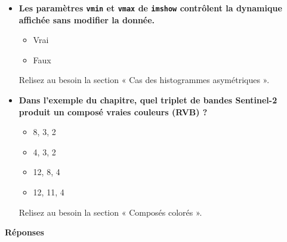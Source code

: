 \documentclass[
  french,
  11pt,
  letterpaper,
  open=any,
  twoside=false,
  french]{scrbook}
\providecommand{\tightlist}{%
  \setlength{\itemsep}{0pt}\setlength{\parskip}{0pt}}
\begin{document}
\begin{itemize}
  Relisez au besoin la section « Égalisation d'histogramme ».
\item
  \textbf{Les paramètres \texttt{vmin} et \texttt{vmax} de
  \texttt{imshow} contrôlent la dynamique affichée sans modifier la
  donnée.}

  \begin{itemize}
  \tightlist
  \item
    Vrai
  \item
    Faux
  \end{itemize}

  Relisez au besoin la section « Cas des histogrammes asymétriques ».
\item
  \textbf{Dans l'exemple du chapitre, quel triplet de bandes Sentinel-2
  produit un composé vraies couleurs (RVB) ?}

  \begin{itemize}
  \tightlist
  \item
    8, 3, 2
  \item
    4, 3, 2
  \item
    12, 8, 4
  \item
    12, 11, 4
  \end{itemize}

  Relisez au besoin la section « Composés colorés ».
\end{itemize}

\textbf{Réponses}
\end{document}

